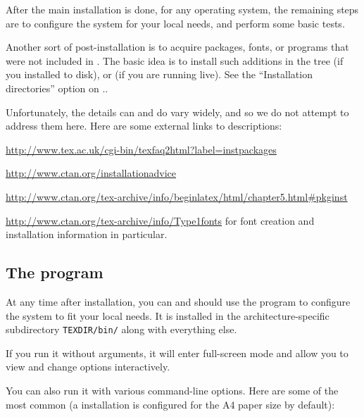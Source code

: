 \documentclass{article}
\begin{document}
After the main installation is done, for any operating system, the
remaining steps are to configure the system for your local needs, and
perform some basic tests.

Another sort of post-installation is to acquire packages, fonts, or
programs that were not included in \TL{}.  The basic idea is to
install such additions in the  tree (if you
installed to disk), or  (if you are running live).
See the ``Installation directories'' option on \p.\pageref{text:instdir}.

Unfortunately, the details can and do vary widely, and so we do not attempt to
address them here.  Here are some external links to descriptions:
\begin{itemize*}
\item
\url{http://www.tex.ac.uk/cgi-bin/texfaq2html?label=instpackages}
\item
\url{http://www.ctan.org/installationadvice}
\item
\url{http://www.ctan.org/tex-archive/info/beginlatex/html/chapter5.html#pkginst}
\item
\url{http://www.ctan.org/tex-archive/info/Type1fonts} for font creation
and installation information in particular.
\end{itemize*}


\subsection{The \protect{} program}
\label{sec:texconfig}

At any time after installation, you can and should use the program
 to configure the system to fit your local needs.  It
is installed in the architecture-specific subdirectory
\texttt{TEXDIR/bin/} along with everything else.

If you run it without arguments, it will enter full-screen mode and
allow you to view and change options interactively.

You can also run it with various command-line options.  Here are some of
the most common (a \TL{} installation is configured for the A4 paper
size by default):
\end{document}
